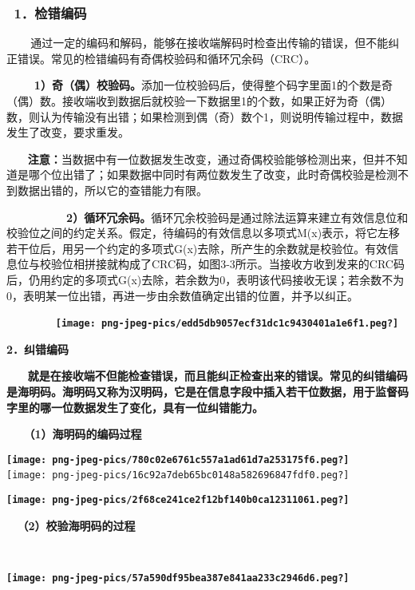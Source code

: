 \subsubsection{\texorpdfstring{\textbf{~1．检错编码}}{~1．检错编码}}\label{ux68c0ux9519ux7f16ux7801}

~ ~
~通过一定的编码和解码，能够在接收端解码时检查出传输的错误，但不能纠正错误。常见的检错编码有奇偶校验码和循环冗余码（CRC）。\emph{}

\textbf{~ ~
~1）奇（偶）校验码。}添加一位校验码后，使得整个码字里面1的个数是奇（偶）数。接收端收到数据后就校验一下数据里1的个数，如果正好为奇（偶）数，则认为传输没有出错；如果检测到偶（奇）数个1，则说明传输过程中，数据发生了改变，要求重发。

\textbf{~ ~
注意：}当数据中有一位数据发生改变，通过奇偶校验能够检测出来，但并不知道是哪个位出错了；如果数据中同时有两位数发生了改变，此时奇偶校验是检测不到数据出错的，所以它的查错能力有限。\textbf{}

\textbf{~ ~ ~ ~ ~
~2）循环冗余码。}循环冗余校验码是通过除法运算来建立有效信息位和校验位之间的约定关系。假定，待编码的有效信息以多项式M(x)表示，将它左移若干位后，用另一个约定的多项式G(x)去除，所产生的余数就是校验位。有效信息位与校验位相拼接就构成了CRC码，如图3-3所示。当接收方收到发来的CRC码后，仍用约定的多项式G(x)去除，若余数为0，表明该代码接收无误；若余数不为0，表明某一位出错，再进一步由余数值确定出错的位置，并予以纠正。

\textbf{~~~~~~~
\texttt{[image: png-jpeg-pics/edd5db9057ecf31dc1c9430401a1e6f1.peg?]}}

\textbf{}

\textbf{\textbf{2．纠错编码}}

\textbf{~ ~
就是在接收端不但能检查错误，而且能纠正检查出来的错误。常见的纠错编码是海明码。海明码又称为汉明码，它是在信息字段中插入若干位数据，用于监督码字里的哪一位数据发生了变化，\textbf{具有一位纠错能力}。}

\textbf{\textbf{~ ~（1）海明码的编码过程}}

\textbf{\texttt{[image: png-jpeg-pics/780c02e6761c557a1ad61d7a253175f6.peg?]}\\
\hspace*{0.333em}}{}
\texttt{[image: png-jpeg-pics/16c92a7deb65bc0148a582696847fdf0.peg?]}\textbf{\\
\hspace*{0.333em}}

\textbf{\texttt{[image: png-jpeg-pics/2f68ce241ce2f12bf140b0ca12311061.peg?]}}

\textbf{}

\textbf{\textbf{~ （2）校验海明码的过程}}

\textbf{\\
}{}

\textbf{\texttt{[image: png-jpeg-pics/57a590df95bea387e841aa233c2946d6.peg?]}}

